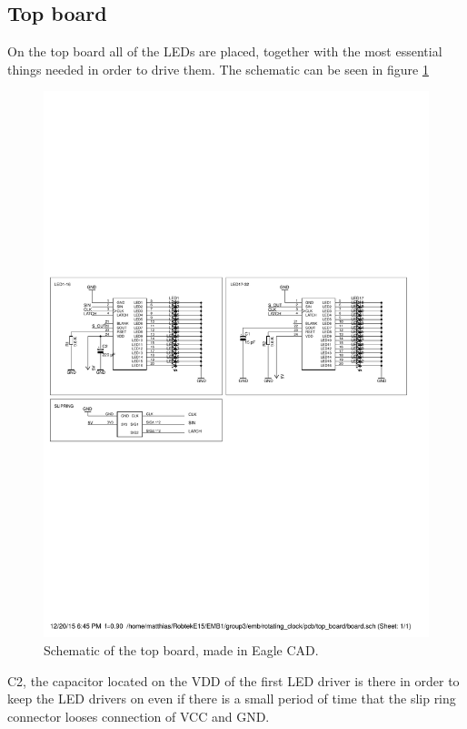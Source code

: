\subsection{Top board}
On the top board all of the LEDs are placed, together with the most essential things needed in order to drive them.
The schematic can be seen in figure \ref{fig:top_board}
\begin{figure}
 \centering
 \includegraphics[width=\textwidth,trim=0 10cm 0 10cm,clip = true]{img/top_board}
 \caption{Schematic of the top board, made in Eagle CAD.}
 \label{fig:top_board}
\end{figure}

C2, the capacitor located on the VDD of the first LED driver is there in order to keep the LED drivers on even if there is a small period of time that the slip ring connector looses connection of VCC and GND.